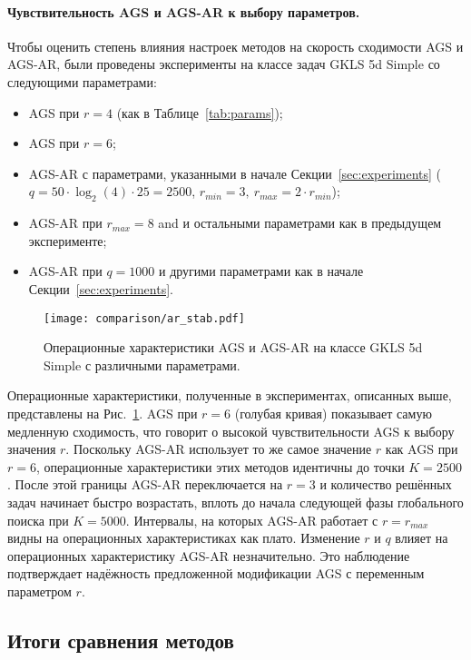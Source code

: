 \paragraph{Чувствительность AGS и AGS-AR к выбору параметров.}

Чтобы оценить степень влияния настроек методов на скорость сходимости AGS и AGS-AR, были проведены
эксперименты на классе задач GKLS 5d Simple со следующими параметрами:
\begin{itemize}
  \item AGS при $r=4$ (как в Таблице~\ref{tab:params});
  \item AGS при $r=6$;
  \item AGS-AR с параметрами, указанными в начале Секции~\ref{sec:experiments}
  ($q=50\cdot\log_2(4)\cdot 25 = 2500$, $r_{min}=3,\:r_{max}=2\cdot r_{min}$);
  \item AGS-AR при $r_{max}=8$ and и остальными параметрами как в предыдущем эксперименте;
  \item AGS-AR при $q=1000$ и другими параметрами как в начале Секции~\ref{sec:experiments}.
\end{itemize}

\begin{figure}[ht]
  \centering
  \texttt{[image: comparison/ar\_stab.pdf]}
  \caption{Операционные характеристики AGS и AGS-AR на классе GKLS 5d Simple
  с различными параметрами.}
  \label{fig:stability}
\end{figure}

Операционные характеристики, полученные в экспериментах, описанных выше, представлены на Рис.~\ref{fig:stability}.
AGS при $r=6$ (голубая кривая) показывает самую медленную сходимость, что говорит о высокой чувствительности AGS
к выбору значения $r$. Поскольку AGS-AR использует то же самое значение $r$ как AGS при $r=6$, операционные характеристики
этих методов идентичны до точки $K=2500$. После этой границы AGS-AR переключается на $r=3$ и количество решённых задач
начинает быстро возрастать, вплоть до начала следующей фазы глобального поиска при $K=5000$. Интервалы, на которых
AGS-AR работает с $r=r_{max}$ видны на операционных характеристиках как плато. Изменение $r$ и $q$ влияет на операционных характеристику
AGS-AR незначительно. Это наблюдение подтверждает надёжность предложенной модификации AGS с переменным параметром $r$.

\subsection{Итоги сравнения методов}

